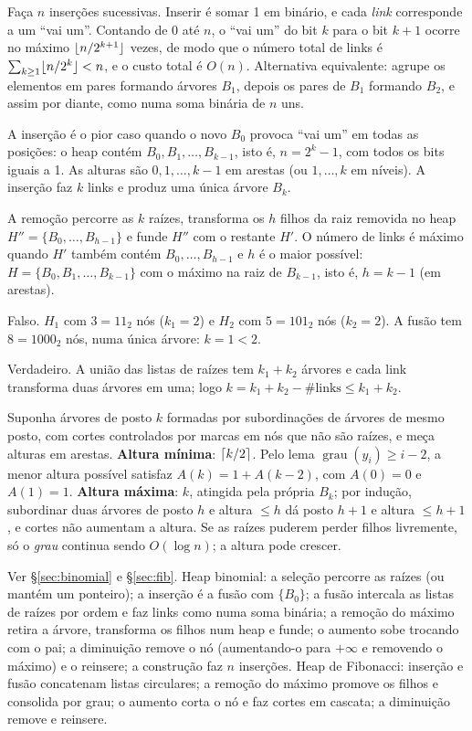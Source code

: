  Faça $n$ inserções sucessivas. Inserir é somar 1 em binário, e cada \emph{link} corresponde a um ``vai um''. Contando de 0 até $n$, o ``vai um'' do bit $k$ para o bit $k+1$ ocorre no máximo $\lfloor n/2^{k+1}\rfloor$ vezes, de modo que o número total de links é $\sum_{k\ge1}\lfloor n/2^k\rfloor<n$, e o custo total é $O(n)$. Alternativa equivalente: agrupe os elementos em pares formando árvores $B_1$, depois os pares de $B_1$ formando $B_2$, e assim por diante, como numa soma binária de $n$ uns.

 A inserção é o pior caso quando o novo $B_0$ provoca ``vai um'' em todas as posições: o heap contém $B_0,B_1,\dots,B_{k-1}$, isto é, $n=2^k-1$, com todos os bits iguais a 1. As alturas são $0,1,\dots,k-1$ em arestas (ou $1,\dots,k$ em níveis). A inserção faz $k$ links e produz uma única árvore $B_k$.

 A remoção percorre as $k$ raízes, transforma os $h$ filhos da raiz removida no heap $H''=\{B_0,\dots,B_{h-1}\}$ e funde $H''$ com o restante $H'$. O número de links é máximo quando $H'$ também contém $B_0,\dots,B_{h-1}$ e $h$ é o maior possível: $H=\{B_0,B_1,\dots,B_{k-1}\}$ com o máximo na raiz de $B_{k-1}$, isto é, $h=k-1$ (em arestas).

 Falso. $H_1$ com $3=11_2$ nós ($k_1=2$) e $H_2$ com $5=101_2$ nós ($k_2=2$). A fusão tem $8=1000_2$ nós, numa única árvore: $k=1<2$.

 Verdadeiro. A união das listas de raízes tem $k_1+k_2$ árvores e cada link transforma duas árvores em uma; logo $k=k_1+k_2-\#\text{links}\le k_1+k_2$.

 Suponha árvores de posto $k$ formadas por subordinações de árvores de mesmo posto, com cortes controlados por marcas em nós que não são raízes, e meça alturas em arestas. \textbf{Altura mínima}: $\lceil k/2\rceil$. Pelo lema $\operatorname{grau}(y_i)\ge i-2$, a menor altura possível satisfaz $A(k)=1+A(k-2)$, com $A(0)=0$ e $A(1)=1$. \textbf{Altura máxima}: $k$, atingida pela própria $B_k$; por indução, subordinar duas árvores de posto $h$ e altura $\le h$ dá posto $h+1$ e altura $\le h+1$, e cortes não aumentam a altura. Se as raízes puderem perder filhos livremente, só o \emph{grau} continua sendo $O(\log n)$; a altura pode crescer.

 Ver §\ref{sec:binomial} e §\ref{sec:fib}. Heap binomial: a seleção percorre as raízes (ou mantém um ponteiro); a inserção é a fusão com $\{B_0\}$; a fusão intercala as listas de raízes por ordem e faz links como numa soma binária; a remoção do máximo retira a árvore, transforma os filhos num heap e funde; o aumento sobe trocando com o pai; a diminuição remove o nó (aumentando-o para $+\infty$ e removendo o máximo) e o reinsere; a construção faz $n$ inserções. Heap de Fibonacci: inserção e fusão concatenam listas circulares; a remoção do máximo promove os filhos e consolida por grau; o aumento corta o nó e faz cortes em cascata; a diminuição remove e reinsere.

